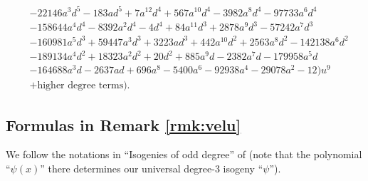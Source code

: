 \documentclass{gtpart}
\theoremstyle{definition}
\theoremstyle{remark}
\begin{document}
\begin{equation*}
\begin{split}
      & - 22146 a^3 d^5 - 183 a d^5 + 7 a^{12} d^4 + 567 a^{10} d^4 - 3982 a^8 d^4 - 97733 a^6 d^4 \\
      & - 158644 a^4 d^4 - 8392 a^2 d^4 - 4 d^4 + 84 a^{11} d^3 + 2878 a^9 d^3 - 57242 a^7 d^3 \\
      & - 160981 a^5 d^3 + 59447 a^3 d^3  +3223 a d^3 + 442 a^{10} d^2 + 2563 a^8 d^2 - 142138 a^6 d^2 \\
      & - 189134 a^4 d^2 + 18323 a^2 d^2 + 20 d^2 + 885 a^9 d - 2382 a^7 d - 179958 a^5 d \\
      & - 164688 a^3 d - 2637 a d + 696 a^8 - 5400 a^6 - 92938 a^4 - 29078 a^2 - 12) u^9 \\
      & + \text{higher degree terms} \big).  
\end{split}
\end{equation*}


\subsection{Formulas in Remark \ref{rmk:velu}}
\label{apx:velu}

We follow the notations in ``Isogenies of odd degree'' of \cite[Section 2.4]{kohel} 
(note that the polynomial ``$\psi(x)$'' there determines our universal degree-3 isogeny ``$\psi$'').  
\end{document}
